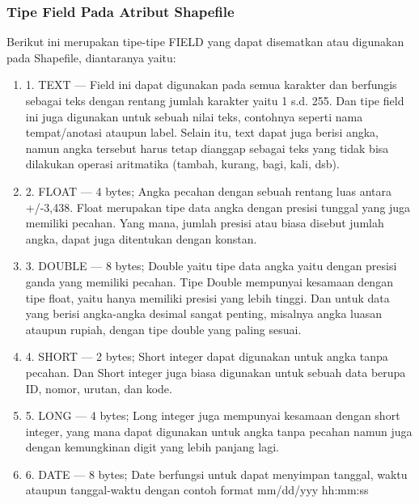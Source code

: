 \subsubsection{Tipe Field Pada Atribut Shapefile}
       Berikut ini merupakan tipe-tipe FIELD yang dapat disematkan atau digunakan pada Shapefile, diantaranya yaitu:
\begin{enumerate}
    \item 1. TEXT — Field ini dapat digunakan pada semua karakter dan berfungis sebagai teks dengan rentang jumlah karakter yaitu 1 s.d.              255. Dan tipe field ini juga digunakan untuk sebuah nilai teks, contohnya seperti nama tempat/anotasi ataupun label. Selain              itu, text dapat juga berisi angka, namun angka tersebut harus tetap dianggap sebagai teks yang tidak bisa dilakukan operasi              aritmatika (tambah, kurang, bagi, kali, dsb).
    \item 2. FLOAT — 4 bytes; Angka pecahan dengan sebuah rentang luas antara +/-3,438. Float merupakan tipe data angka dengan presisi                tunggal yang juga memiliki pecahan. Yang mana, jumlah presisi atau biasa disebut jumlah angka, dapat juga ditentukan dengan              konstan.
    \item 3. DOUBLE — 8 bytes; Double yaitu tipe data angka yaitu dengan presisi ganda yang memiliki pecahan. Tipe Double mempunyai                  kesamaan  dengan tipe float, yaitu hanya memiliki presisi yang lebih tinggi. Dan untuk data yang berisi angka-angka desimal              sangat penting, misalnya angka luasan ataupun rupiah, dengan tipe double yang paling sesuai.
    \item 4. SHORT — 2 bytes; Short integer dapat digunakan untuk angka tanpa pecahan. Dan Short integer juga biasa digunakan untuk                   sebuah data berupa ID, nomor, urutan, dan kode.
    \item 5. LONG — 4 bytes; Long integer juga mempunyai kesamaan dengan short integer, yang mana dapat digunakan untuk angka tanpa                  pecahan namun juga  dengan kemungkinan digit yang lebih panjang lagi.
    \item 6. DATE — 8 bytes; Date berfungsi untuk dapat menyimpan tanggal, waktu ataupun tanggal-waktu dengan contoh format mm/dd/yyy                hh:mm:ss
\end{enumerate}

